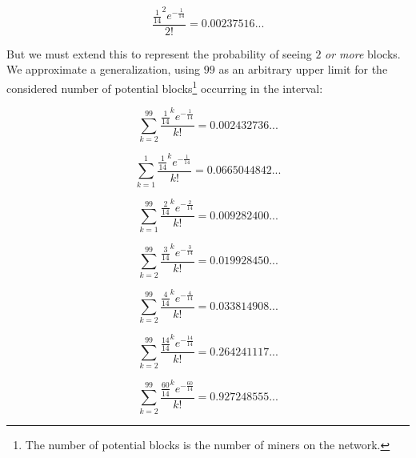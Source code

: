 \documentclass[11pt]{article}
\theoremstyle{plain}
\begin{document}
{{\begin{equation}
  \frac{\frac{1}{14}^{2}e^{-\frac{1}{14}}}{2!} = 0.00237516...
\end{equation}

But we must extend this to represent the probability of seeing $2$ \emph{or
more} blocks.
We approximate a generalization, using $99$ as an arbitrary upper limit for the
considered number of potential blocks\footnote{The number of potential blocks
is the number of miners on the network.} occurring in the interval:

\begin{equation}
  \sum_{k=2}^{99}\frac{\frac{1}{14}^{k}e^{-\frac{1}{14}}}{k!} = 0.002432736...
\end{equation}


\begin{equation}
    \sum_{k=1}^{1}\frac{\frac{1}{14}^{k}e^{-\frac{1}{14}}}{k!} = 0.0665044842...
\end{equation}

\begin{equation}
    \sum_{k=1}^{99}\frac{\frac{2}{14}^{k}e^{-\frac{2}{14}}}{k!} = 0.009282400...
\end{equation}

\begin{equation}
    \sum_{k=2}^{99}\frac{\frac{3}{14}^{k}e^{-\frac{3}{14}}}{k!} = 0.019928450...
\end{equation}

\begin{equation}
    \sum_{k=2}^{99}\frac{\frac{4}{14}^{k}e^{-\frac{4}{14}}}{k!} = 0.033814908...
\end{equation}

\begin{equation}
    \sum_{k=2}^{99}\frac{\frac{14}{14}^{k}e^{-\frac{14}{14}}}{k!} = 0.264241117...
\end{equation}

\begin{equation}
    \sum_{k=2}^{99}\frac{\frac{60}{14}^{k}e^{-\frac{60}{14}}}{k!} = 0.927248555...
\end{equation}


}}
\end{document}
